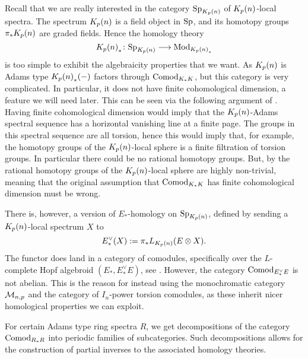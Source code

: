 \begin{remark}
    Recall that we are really interested in the category $\mathrm{Sp}_{{K_p(n)}}$ of ${K_p(n)}$-local spectra. The spectrum ${K_p(n)}$ is a field object in $\mathrm{Sp}$, and its homotopy groups $\pi_* {K_p(n)}$ are graded fields. Hence the homology theory 
    \[{K_p(n)}_*\colon \mathrm{Sp}_{{K_p(n)}}\longrightarrow \mathrm{Mod}_{{K_p(n)}_*}\] 
    is too simple to exhibit the algebraicity properties that we want. As ${K_p(n)}$ is Adams type ${K_p(n)}_*(-)$ factors through $\mathrm{Comod}_{K_*K}$, but this category is very complicated. In particular, it does not have finite cohomological dimension, a feature we will need later. This can be seen via the following argument of \cite{barthel-pstragowski_2021}. Having finite cohomological dimension would imply that the ${K_p(n)}$-Adams spectral sequence has a horizontal vanishing line at a finite page. The groups in this spectral sequence are all torsion, hence this would imply that, for example, the homotopy groups of the ${K_p(n)}$-local sphere is a finite filtration of torsion groups. In particular there could be no rational homotopy groups. But, by \cite{barthel_schlank_stapleton_weinstein_2024} the rational homotopy groups of the ${K_p(n)}$-local sphere are highly non-trivial, meaning that the original assumption that $\mathrm{Comod}_{K_*K}$ has finite cohomological dimension must be wrong. 
    
    There is, however, a version of $E_*$-homology on $\mathrm{Sp}_{{K_p(n)}}$, defined by sending a ${K_p(n)}$-local spectrum $X$ to 
    \[E_*^\vee (X) := \pi_*L_{{K_p(n)}}(E\otimes X).\]
    The functor does land in a category of comodules, specifically over the $L$-complete Hopf algebroid $(E_*, E_*^\vee E)$, see \cite[5.3]{baker_2009}. However, the category $\mathrm{Comod}_{E_*^\vee E}$ is not abelian. This is the reason for instead using the monochromatic category $\mathcal{M}_{n,p}$ and the category of $I_n$-power torsion comodules, as these inherit nicer homological properties we can exploit. 
\end{remark}

For certain Adams type ring spectra $R$, we get decompositions of the category $\mathrm{Comod}_{R_*R}$ into periodic families of subcategories. Such decompositions allows for the construction of partial inverses to the associated homology theories. 

